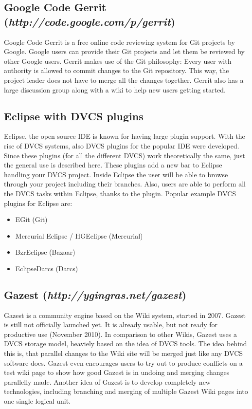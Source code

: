 \subsection{Google Code Gerrit \\(\textit{http://code.google.com/p/gerrit})}

Google Code Gerrit is a free online code reviewing system for Git projects by Google. Google users can provide their Git projects and let them be reviewed by other Google users. Gerrit makes use of the Git philosophy: Every user with authority is allowed to commit changes to the Git repository. This way, the project leader does not have to merge all the changes together. Gerrit also has a large discussion group along with a wiki to help new users getting started. 

\subsection{Eclipse with DVCS plugins}

Eclipse, the open source IDE is known for having large plugin support. With the rise of DVCS systems, also DVCS plugins for the popular IDE were developed. Since these plugins (for all the different DVCS) work theoretically the same, just the general use is described here. These plugins add a new bar to Eclipse handling your DVCS project. Inside Eclipse the user will be able to browse through your project including their branches. Also, users are able to perform all the DVCS tasks within Eclipse, thanks to the plugin.
\newline
Popular example DVCS plugins for Eclipse are:

\begin{itemize}
	\item EGit (Git)
	\item Mercurial Eclipse / HGEclipse (Mercurial)
	\item BzrEclipse (Bazaar)
	\item EclipseDarcs (Darcs)
\end{itemize}

\cite{eclipseplugins}

\subsection{Gazest (\textit{http://ygingras.net/gazest})}

Gazest is a community engine based on the Wiki system, started in 2007. Gazest is still not officially launched yet. It is already usable, but not ready for productive use (November 2010). In comparison to other Wikis, Gazest uses a DVCS storage model, heaviely based on the idea of DVCS tools. The idea behind this is, that parallel changes to the Wiki site will be merged just like any DVCS software does. Gazest even encourages users to try out to produce conflicts on a test wiki page to show how good Gazest is in undoing and merging changes parallelly made. Another idea of Gazest is to develop completely new technologies, including branching and merging of multiple Gazest Wiki pages into one single logical unit.
